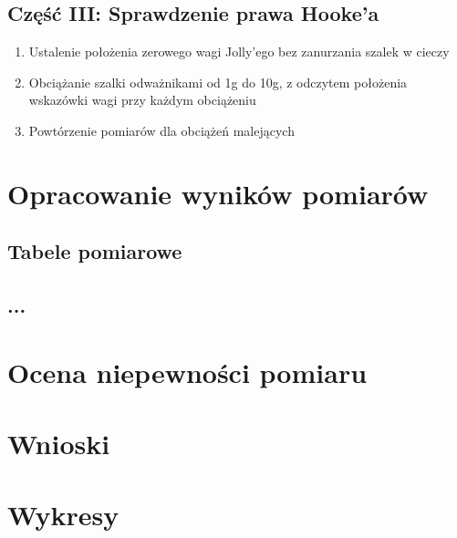 \documentclass[a4paper,12pt]{article}
\begin{document}
\subsection*{Część III: Sprawdzenie prawa Hooke'a}
\begin{enumerate}
    \setlength{\itemsep}{0em}
    \item Ustalenie położenia zerowego wagi Jolly'ego bez zanurzania szalek w cieczy
    \item Obciążanie szalki odważnikami od 1g do 10g, z odczytem położenia wskazówki wagi przy każdym obciążeniu
    \item Powtórzenie pomiarów dla obciążeń malejących
\end{enumerate}

\section{Opracowanie wyników pomiarów}

\subsection{Tabele pomiarowe}

\subsection{...}

\section{Ocena niepewności pomiaru}

\section{Wnioski}

\section{Wykresy}



\end{document}
